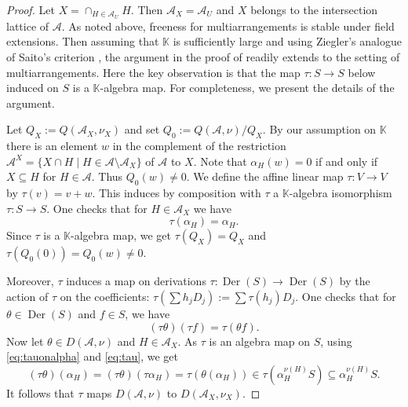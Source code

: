 \begin{proof}
Let $X = \cap_{H \in {{\mathcal A}}_U} H$. Then ${{\mathcal A}}_X = {{\mathcal A}}_U$ and $X$ belongs to the 
intersection lattice of ${{\mathcal A}}$. 
As noted above, freeness for multiarrangements is 
stable under field extensions. 
Then assuming that ${{\mathbb K}}$ is sufficiently large and
using Ziegler's analogue of Saito's criterion 
\cite[Thm.\ 8]{ziegler:multiarrangements},
the argument in the 
proof of \cite[Thm.\ 4.37]{orlikterao:arrangements}
readily extends to the setting of multiarrangements.
Here the key observation is that the
map $\tau : S \to S$ below induced on $S$
is a ${{\mathbb K}}$-algebra map.
For completeness, we present the details of the argument.

Let $Q_X := Q({{\mathcal A}}_X, \nu_X)$ and set 
$Q_0 := Q({{\mathcal A}}, \nu)/Q_X$.
By our assumption on ${{\mathbb K}}$ there is an element $w$
in the complement of the restriction 
${{\mathcal A}}^X = \{ X \cap H \mid H \in {{\mathcal A}} \setminus {{\mathcal A}}_X\}$
of ${{\mathcal A}}$ to $X$.
Note that $\alpha_H(w) = 0$ if and only if $X \subseteq H$
for $H \in {{\mathcal A}}$.
Thus $Q_0(w) \ne 0$.
We define the affine linear map $\tau : V \to V$
by $\tau(v) = v + w$.
This induces by composition  with $\tau$ a ${{\mathbb K}}$-algebra isomorphism 
$\tau : S \to S$.
One checks that for $H \in {{\mathcal A}}_X$ we have 
\begin{equation}
\label{eq:tauonalpha}
\tau(\alpha_H) = \alpha_H.
\end{equation}
Since $\tau$ is a ${{\mathbb K}}$-algebra map, 
we get $\tau(Q_X) = Q_X$ and $\tau(Q_0(0)) = Q_0(w) \ne 0$.

Moreover, $\tau$ induces a map on derivations
$\tau : {{\operatorname{Der}}}(S) \to {{\operatorname{Der}}}(S)$ by the action of $\tau$ on the
coefficients:   
$\tau (\sum h_j D_j) := \sum \tau(h_j) D_j$.
One checks that for $\theta \in {{\operatorname{Der}}}(S)$ and $f \in S$, we have 
\begin{equation}
\label{eq:tau}
(\tau \theta)(\tau f) = \tau (\theta f). 
\end{equation}
Now let $\theta \in D({{\mathcal A}}, \nu)$ and $H \in {{\mathcal A}}_X$. 
As $\tau$ is an algebra map on $S$, 
using \eqref{eq:tauonalpha} and \eqref{eq:tau}, we get
\[
(\tau \theta) (\alpha_H)  = (\tau \theta) (\tau \alpha_H)  = 
\tau (\theta (\alpha_H))  \in \tau(\alpha_H^{\nu(H)} S ) 
\subseteq  \alpha_H^{\nu(H)} S.
\]
It follows that $\tau$ maps $D({{\mathcal A}}, \nu)$ to $D({{\mathcal A}}_X, \nu_X)$.


\end{proof}
